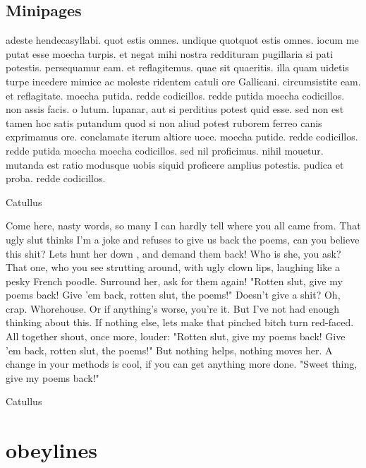 \subsection{Minipages}
\begin{minipage}{6.7cm}
\parindent=0pt 
{\obeylines

adeste hendecasyllabi. quot estis 
omnes. undique quotquot estis omnes. 
iocum me putat esse moecha turpis. 
et negat mihi nostra reddituram 
pugillaria si pati potestis. 
persequamur eam. et reflagitemus. 
quae sit quaeritis. illa quam uidetis 
turpe incedere mimice ac moleste 
ridentem catuli ore Gallicani. 
circumsistite eam. et reflagitate. 
moecha putida. redde codicillos. 
redde putida moecha codicillos. 
non assis facis. o lutum. lupanar, 
aut si perditius potest quid esse. 
sed non est tamen hoc satis putandum 
quod si non aliud potest ruborem 
ferreo canis exprimamus ore. 
conclamate iterum altiore uoce. 
moecha putide. redde codicillos. 
redde putida moecha moecha codicillos. 
sed nil proficimus. nihil mouetur. 
mutanda est ratio modusque uobis 
siquid proficere amplius potestis. 
pudica et proba. redde codicillos.

\hfil Catullus\par}
\end{minipage}
\hspace{0.8em}
\begin{minipage}{8cm}
{\obeylines
Come here, nasty words, so many I can hardly 
tell where you all came from. 
That ugly slut thinks I'm a joke 
and refuses to give us back 
the poems, can you believe this shit? 
Lets hunt her down , and demand them back! 
Who is she, you ask? That one, who you see 
strutting around, with ugly clown lips, 
laughing like a pesky French poodle. 
Surround her, ask for them again! 
"Rotten slut, give my poems back! 
Give 'em back, rotten slut, the poems!" 
Doesn't give a shit? Oh, crap. Whorehouse. 
Or if anything's worse, you're it. 
But I've not had enough thinking about this. 
If nothing else, lets make that 
pinched bitch turn red-faced. 
All together shout, once more, louder: 
"Rotten slut, give my poems back! 
Give 'em back, rotten slut, the poems!" 
But nothing helps, nothing moves her. 
A change in your methods is cool, 
if you can get anything more done. 
"Sweet thing, give my poems back!"\par

\hfil Catullus\par}
\end{minipage}


\section{obeylines}

